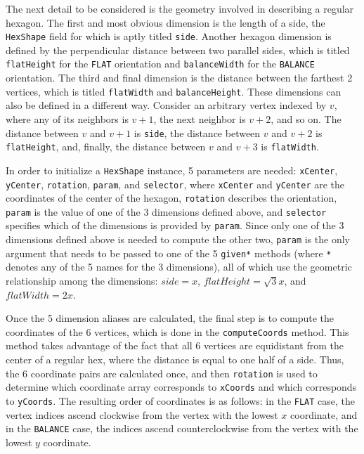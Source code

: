 \documentclass[pageno]{jpaper}
\begin{document}
\begin{doublespacing}
The next detail to be considered is the geometry involved in describing a regular hexagon. The first and most obvious dimension is the length of a side, the \lstinline$HexShape$ field for which is aptly titled \lstinline$side$. Another hexagon dimension is defined by the perpendicular distance between two parallel sides, which is titled \lstinline$flatHeight$ for the \lstinline$FLAT$ orientation and \lstinline$balanceWidth$ for the \lstinline$BALANCE$ orientation. The third and final dimension is the distance between the farthest 2 vertices, which is titled \lstinline$flatWidth$ and \lstinline$balanceHeight$. These dimensions can also be defined in a different way. Consider an arbitrary vertex indexed by $v$, where any of its neighbors is $v + 1$, the next neighbor is $v + 2$, and so on. The distance between $v$ and $v + 1$ is \lstinline$side$, the distance between $v$ and $v + 2$ is \lstinline$flatHeight$, and, finally, the distance between $v$ and $v + 3$ is \lstinline$flatWidth$. 

In order to initialize a \lstinline$HexShape$ instance, 5 parameters are needed: \lstinline$xCenter$, \lstinline$yCenter$, \lstinline$rotation$, \lstinline$param$, and \lstinline$selector$, where \lstinline$xCenter$ and \lstinline$yCenter$ are the coordinates of the center of the hexagon, \lstinline$rotation$ describes the orientation, \lstinline$param$ is the value of one of the 3 dimensions defined above, and \lstinline$selector$ specifies which of the dimensions is provided by \lstinline$param$. Since only one of the 3 dimensions defined above is needed to compute the other two, \lstinline$param$ is the only argument that needs to be passed to one of the 5 \lstinline$given*$ methods (where \lstinline$*$ denotes any of the 5 names for the 3 dimensions), all of which use the geometric relationship among the dimensions: $side = x$, $flatHeight = \sqrt{3}x$, and $flatWidth = 2x$.

Once the 5 dimension aliases are calculated, the final step is to compute the coordinates of the 6 vertices, which is done in the \lstinline$computeCoords$ method. This method takes advantage of the fact that all 6 vertices are equidistant from the center of a regular hex, where the distance is equal to one half of a side. Thus, the 6 coordinate pairs are calculated once, and then \lstinline$rotation$ is used to determine which coordinate array corresponds to \lstinline$xCoords$ and which corresponds to \lstinline$yCoords$. The resulting order of coordinates is as follows: in the \lstinline$FLAT$ case, the vertex indices ascend clockwise from the vertex with the lowest $x$ coordinate, and in the \lstinline$BALANCE$ case, the indices ascend counterclockwise from the vertex with the lowest $y$ coordinate.


\end{doublespacing}
\end{document}
